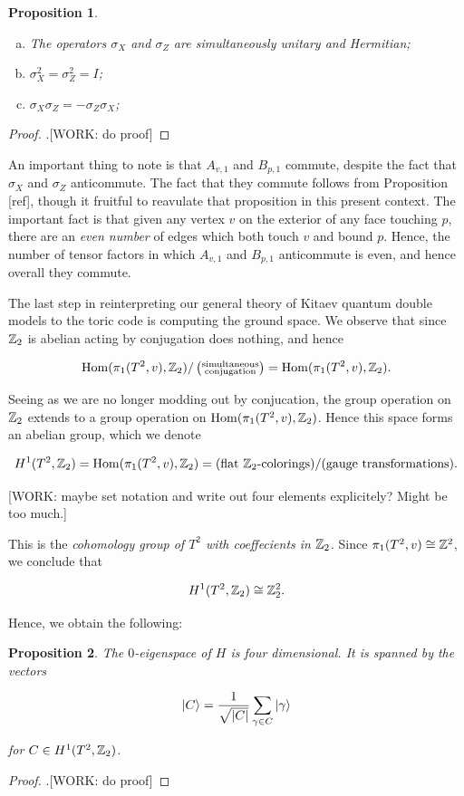 \documentclass{article}
\newtheorem{proposition}{Proposition}[section]
\theoremstyle{definition}
\numberwithin{figure}{section}
\begin{document}
\begin{proposition}$\,$
\begin{enumerate}[(a)]
\item The operators $\sigma_X$ and $\sigma_Z$ are simultaneously unitary and Hermitian;
\item $\sigma_X^2=\sigma_Z^2=I$;
\item $\sigma_X \sigma_Z = - \sigma_Z \sigma_X$;
\end{enumerate}
\end{proposition}
\begin{proof}.[WORK: do proof]
\end{proof}

An important thing to note is that $A_{v,1}$ and $B_{p,1}$ commute, despite the fact that $\sigma_X$ and $\sigma_Z$ anticommute. The fact that they commute follows from Proposition [ref], though it fruitful to reavulate that proposition in this present context. The important fact is that given any vertex $v$ on the exterior of any face touching $p$,  there are an \textit{even number} of edges which both touch $v$ and bound $p$. Hence, the number of tensor factors in which $A_{v,1}$ and $B_{p,1}$ anticommute is even, and hence overall they commute.

The last step in reinterpreting our general theory of Kitaev quantum double models to the toric code is computing the ground space. We observe that since $\mathbb{Z}_2$ is abelian acting by conjugation does nothing, and hence

$$\mathrm{Hom}(\pi_1(T^2,v), \mathbb{Z}_2)/\left(\substack{\text{simultaneous} \\ \text{conjugation}}\right)=\mathrm{Hom}(\pi_1(T^2,v), \mathbb{Z}_2).$$

Seeing as we are no longer modding out by conjucation, the group operation on $\mathbb{Z}_2$ extends to a group operation on $\mathrm{Hom}(\pi_1(T^2,v), \mathbb{Z}_2)$. Hence this space forms an abelian group, which we denote

$$H^1(T^2,\mathbb{Z}_2)=\mathrm{Hom}(\pi_1(T^2,v), \mathbb{Z}_2)=(\text{flat $\mathbb{Z}_2$-colorings})/(\text{gauge transformations}).$$

[WORK: maybe set notation and write out four elements explicitely? Might be too much.]

This is the \textit{cohomology group of $T^2$ with coeffecients in $\mathbb{Z}_2$}. Since $\pi_1(T^2,v)\cong \mathbb{Z}^2$, we conclude that

$$H^1(T^2,\mathbb{Z}_2)\cong \mathbb{Z}_2^2.$$

Hence, we obtain the following:

\begin{proposition} The $0$-eigenspace of $H$ is four dimensional. It is spanned by the vectors

$$\ket{C}=\frac{1}{\sqrt{|C|}}\sum_{\gamma\in C}\ket{\gamma}$$

for $C\in H^1(T^2,\mathbb{Z}_2)$.
\end{proposition}
\begin{proof}.[WORK: do proof]
\end{proof}
\end{document}
